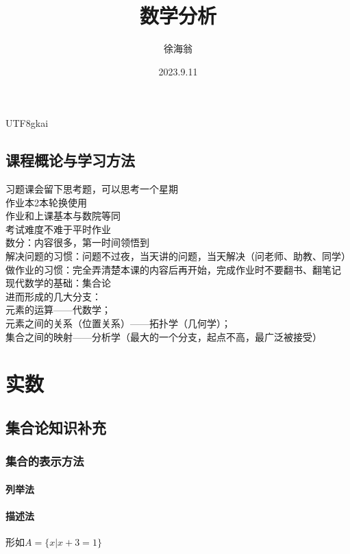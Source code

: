 \documentclass{article}
\title{数学分析}
\author{徐海翁}
\date{2023.9.11}
\begin{document}
\begin{CJK}{UTF8}{gkai}
\maketitle

\subsection{课程概论与学习方法}
习题课会留下思考题，可以思考一个星期\\
作业本2本轮换使用\\
作业和上课基本与数院等同\\
考试难度不难于平时作业\\
数分：内容很多，第一时间领悟到\\
解决问题的习惯：问题不过夜，当天讲的问题，当天解决（问老师、助教、同学）\\
做作业的习惯：完全弄清楚本课的内容后再开始，完成作业时不要翻书、翻笔记\\
现代数学的基础：集合论\\
进而形成的几大分支：\\
元素的运算——代数学；\\
元素之间的关系（位置关系）——拓扑学（几何学）；\\
集合之间的映射——分析学（最大的一个分支，起点不高，最广泛被接受）\\
\newpage
\section{实数}
\subsection{集合论知识补充}
\subsubsection{集合的表示方法}
\paragraph{列举法\\}
\paragraph{描述法\\}
形如$A=\{x|x+3=1\}$\\

\end{CJK}
\end{document}
